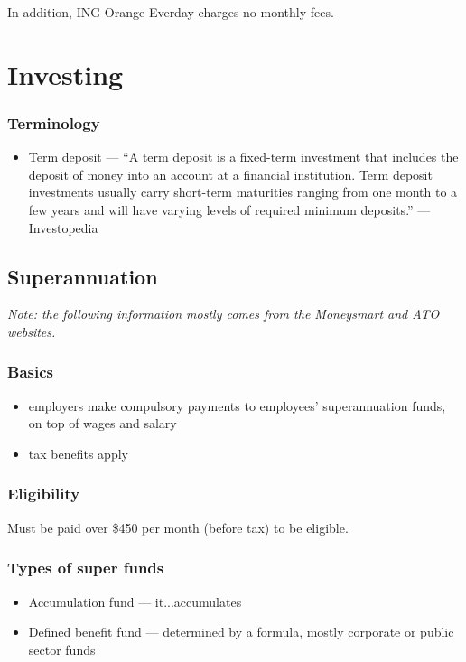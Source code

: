 In addition, ING Orange Everday charges no monthly fees.

\section{Investing}

\subsubsection{Terminology}
\begin{itemize}
	\item Term deposit --- ``A term deposit is a fixed-term investment that includes the deposit of money into an account at a financial institution. Term deposit investments usually carry short-term maturities ranging from one month to a few years and will have varying levels of required minimum deposits.'' --- Investopedia \cite{investopedia_term_deposit}
\end{itemize}

\subsection{Superannuation}

\textit{Note: the following information mostly comes from the Moneysmart \cite{moneysmart_super} and ATO \cite{ato_super} websites.}

\subsubsection{Basics}
\begin{itemize}
	\item employers make compulsory payments to employees' superannuation funds, on top of wages and salary
	\item tax benefits apply
\end{itemize}

\subsubsection{Eligibility}
Must be paid over \$450 per month (before tax) to be eligible.

\subsubsection{Types of super funds}
\begin{itemize}
	\item Accumulation fund --- it...accumulates
	\item Defined benefit fund --- determined by a formula, mostly corporate or public sector funds
\end{itemize}

